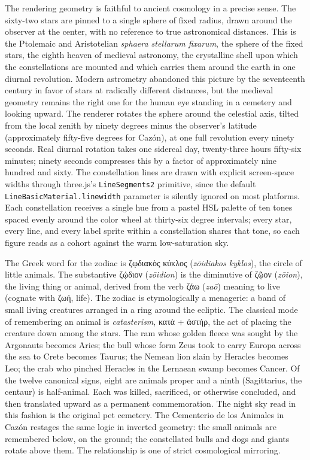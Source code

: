 \documentclass[11pt,openany]{book}
\begin{document}
The rendering geometry is faithful to ancient cosmology in a precise sense. The sixty-two stars are pinned to a single sphere of fixed radius, drawn around the observer at the center, with no reference to true astronomical distances. This is the Ptolemaic and Aristotelian \emph{sphaera stellarum fixarum}, the sphere of the fixed stars, the eighth heaven of medieval astronomy, the crystalline shell upon which the constellations are mounted and which carries them around the earth in one diurnal revolution. Modern astrometry abandoned this picture by the seventeenth century in favor of stars at radically different distances, but the medieval geometry remains the right one for the human eye standing in a cemetery and looking upward. The renderer rotates the sphere around the celestial axis, tilted from the local zenith by ninety degrees minus the observer's latitude (approximately fifty-five degrees for Cazón), at one full revolution every ninety seconds. Real diurnal rotation takes one sidereal day, twenty-three hours fifty-six minutes; ninety seconds compresses this by a factor of approximately nine hundred and sixty. The constellation lines are drawn with explicit screen-space widths through three.js's \texttt{LineSegments2} primitive, since the default \texttt{LineBasicMaterial.linewidth} parameter is silently ignored on most platforms. Each constellation receives a single hue from a pastel HSL palette of ten tones spaced evenly around the color wheel at thirty-six degree intervals; every star, every line, and every label sprite within a constellation shares that tone, so each figure reads as a cohort against the warm low-saturation sky.

The Greek word for the zodiac is ζῳδιακὸς κύκλος (\emph{zōidiakos kyklos}), the circle of little animals. The substantive ζῴδιον (\emph{zōidion}) is the diminutive of ζῷον (\emph{zōion}), the living thing or animal, derived from the verb ζάω (\emph{zaō}) meaning to live (cognate with ζωή, life). The zodiac is etymologically a menagerie: a band of small living creatures arranged in a ring around the ecliptic. The classical mode of remembering an animal is \emph{catasterism}, κατὰ + ἀστήρ, the act of placing the creature down among the stars. The ram whose golden fleece was sought by the Argonauts becomes Aries; the bull whose form Zeus took to carry Europa across the sea to Crete becomes Taurus; the Nemean lion slain by Heracles becomes Leo; the crab who pinched Heracles in the Lernaean swamp becomes Cancer. Of the twelve canonical signs, eight are animals proper and a ninth (Sagittarius, the centaur) is half-animal. Each was killed, sacrificed, or otherwise concluded, and then translated upward as a permanent commemoration. The night sky read in this fashion is the original pet cemetery. The Cementerio de los Animales in Cazón restages the same logic in inverted geometry: the small animals are remembered below, on the ground; the constellated bulls and dogs and giants rotate above them. The relationship is one of strict cosmological mirroring.
\end{document}
